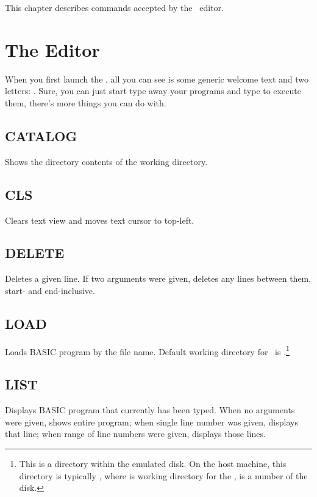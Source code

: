 This chapter describes commands accepted by the \tbas\ editor.

\section{The Editor}

When you first launch the \tbas, all you can see is some generic welcome text and two letters: . Sure, you can just start type away your programs and type  to execute them, there's more things you can do with.

\subsection{CATALOG}
    \par
    Shows the directory contents of the working directory.

\subsection{CLS}
    \par
    Clears text view and moves text cursor to top-left.

\subsection{DELETE}
    \par
    Deletes a given line. If two arguments were given, deletes any lines between them, start- and end-inclusive.

\subsection{LOAD}
    \par
    Loads BASIC program by the file name. Default working directory for \tbas\ is .\footnote{This is a directory within the emulated disk. On the host machine, this directory is typically , where  is working directory for the \thismachine,  is a number of the disk.}
    
\subsection{LIST}
    \par
    Displays BASIC program that currently has been typed. When no arguments were given, shows entire program; when single line number was given, displays that line; when range of line numbers were given, displays those lines.
    
